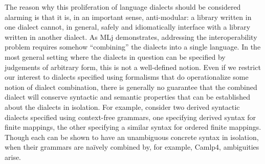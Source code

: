 The reason why this proliferation of language dialects should be considered alarming is that it is, in an important sense, anti-modular: a library written in one dialect cannot, in general, safely and idiomatically interface with a library written in another dialect. %
As MLj demonstrates, addressing the interoperability problem requires somehow ``combining'' the  dialects into a single language. In the most general setting where the dialects in question can be specified by judgements of arbitrary form, this is not a well-defined notion. Even if we restrict our interest to dialects specified using formalisms that do operationalize some notion of dialect combination, there is generally no guarantee that the combined dialect will conserve syntactic and semantic properties that can be established about the dialects in isolation. %
For example, consider two derived syntactic dialects specified using context-free grammars, one specifying derived syntax for finite mappings, the other specifying a similar syntax for ordered finite mappings. Though each can be shown to have an unambiguous concrete syntax in isolation, when their grammars are na\"ively  combined by, for example, Camlp4,  ambiguities  arise.  %
